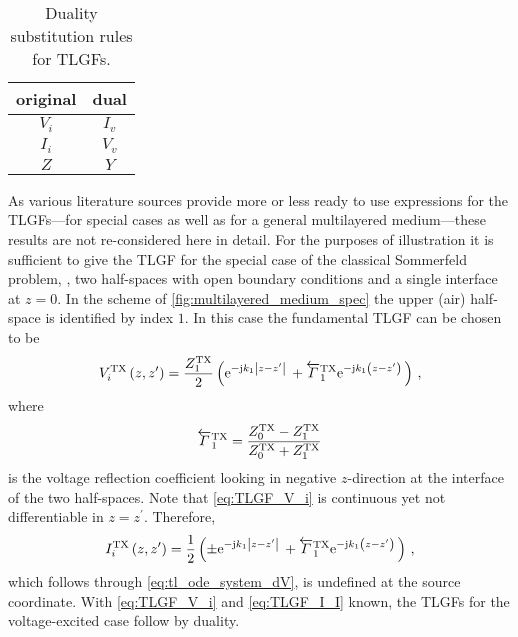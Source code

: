 \begin{table}[hbt]
	\centering
	\begin{tabular}{cc}
		\toprule%
		\textbf{original} & \textbf{dual}\\ \midrule
		$V_i$ & $I_v$ \\
		$I_i$ & $V_v$ \\
		$Z$ & $Y$ \\
		\bottomrule
	\end{tabular}
	\caption{Duality substitution rules for \acp{TLGF}.}
	\label{tab:tlgf_duality}
\end{table}

As various literature sources
\cite{Michalski1990,Hsu1993,Ho1994,Eibert1997,Michalski2005}
provide more or less ready to use expressions for the \acp{TLGF}---for special
cases as well as for a general multilayered medium---these results are not
re-considered here in detail.
For the purposes of illustration it is sufficient to give the \acs{TLGF} for
the special case of the classical Sommerfeld problem, \ie, two half-spaces
with open boundary conditions and a single interface at $z = 0$.
In the scheme of \cref{fig:multilayered_medium_spec} the upper (air) half-space
is identified by index $1$.
In this case the fundamental \ac{TLGF} can be chosen to be \cite{Michalski2016b}
\begin{equation}\label{eq:TLGF_V_i}
	V_i^{\mathrm{TX}} \left(z, z^\prime\right)
	=
	\frac{Z_1^{\mathrm{TX}}}{2}
	\left(
		\mathrm{e}^{-\mathrm{j} k_1 \left\vert z - z^\prime\right\vert}\,
		+
		\overleftarrow{\Gamma}_1^{\mathrm{TX}}
		\mathrm{e}^{-\mathrm{j} k_1 \left(z - z^\prime\right)}\,
	\right)
	\, ,
\end{equation}
where
\begin{equation}
	\overleftarrow{\Gamma}_1^{\mathrm{TX}}
	=
	\frac{Z_0^{\mathrm{TX}} - Z_1^{\mathrm{TX}}}{Z_0^{\mathrm{TX}} + Z_1^{\mathrm{TX}}}
\end{equation}
is the voltage reflection coefficient looking in negative $z$-direction at the
interface of the two half-spaces.
Note that \eqref{eq:TLGF_V_i} is continuous yet not differentiable in
$z = z^\prime$.
Therefore,
\begin{equation}\label{eq:TLGF_I_I}
	I_i^{\mathrm{TX}} \left(z, z^\prime\right)
	=
	\frac{1}{2}
	\left(
		\pm
		\mathrm{e}^{-\mathrm{j} k_1 \left\vert z - z^\prime\right\vert}\,
		+
		\overleftarrow{\Gamma}_1^{\mathrm{TX}}
		\mathrm{e}^{-\mathrm{j} k_1 \left(z - z^\prime\right)}\,
	\right)
	\, ,
\end{equation}
which follows through \eqref{eq:tl_ode_system_dV}, is undefined at the source
coordinate.
With \eqref{eq:TLGF_V_i} and \eqref{eq:TLGF_I_I} known, the \acp{TLGF} for the
voltage-excited case follow by duality.

